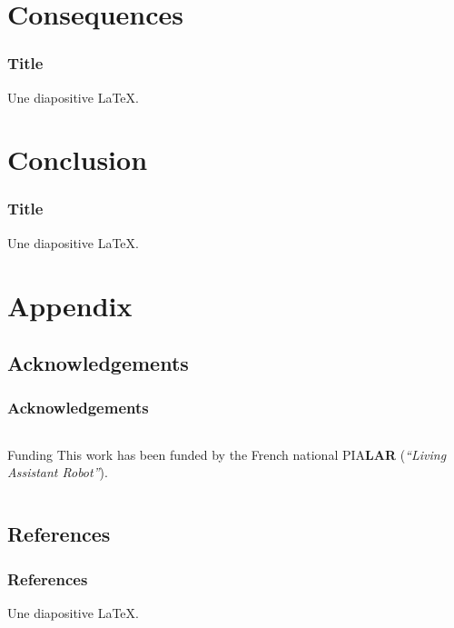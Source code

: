 \documentclass[10pt,c]{beamer}
\begin{document}

\section{Consequences}

\begin{frame}
\frametitle{Title}
Une diapositive \LaTeX.
\end{frame}


\section{Conclusion}

\begin{frame}
\frametitle{Title}
Une diapositive \LaTeX.
\end{frame}


\appendix


\section{Appendix}

\subsection{Acknowledgements}

\begin{frame}
\frametitle{Acknowledgements}
\begin{columns}[c]
\begin{column}{8.25cm}
\begin{block}{Funding}
This work has been funded by the French national PIA\footnotemark[1]
\textbf{LAR} (\textit{``Living Assistant Robot''}).
\end{block}
\end{column}
\end{columns}
\end{frame}

\subsection{References}

\begin{frame}
\frametitle{References}
Une diapositive \LaTeX.
\end{frame}


\end{document}
